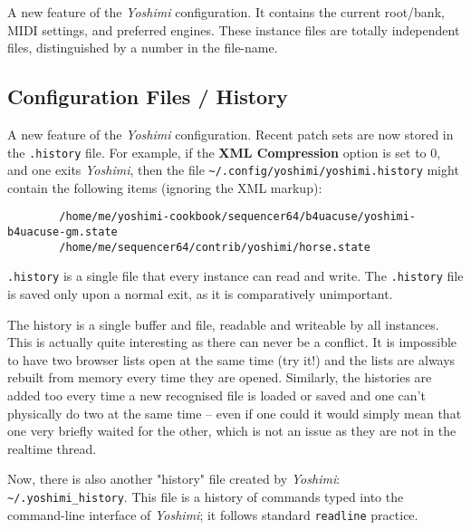    A new feature of the \textsl{Yoshimi} configuration.
   It contains the current root/bank, MIDI settings, and preferred engines.
   These instance files are totally independent files, distinguished by a number
   in the file-name.

\subsection{Configuration Files / History}
\label{subsec:configuration_history}

   A new feature of the \textsl{Yoshimi} configuration.
   Recent patch sets are now stored in the \texttt{.history} file.
   For example, if the \textbf{XML Compression} option is set to 0, and one
   exits \textsl{Yoshimi}, then the file
   \texttt{\textasciitilde/.config/yoshimi/yoshimi.history} might
   contain the following items (ignoring the XML markup):

   \begin{verbatim}
		/home/me/yoshimi-cookbook/sequencer64/b4uacuse/yoshimi-b4uacuse-gm.state
		/home/me/sequencer64/contrib/yoshimi/horse.state
   \end{verbatim}

   \texttt{.history} is a single file that every instance can read and write.
   The \texttt{.history} file is saved only upon a normal exit, as it is
   comparatively unimportant.

   The history is a single buffer and file, readable and writeable by all
   instances. This is actually quite interesting as there can never be a
   conflict.  It is impossible to have two browser lists open at the same time
   (try it!) and the lists are always rebuilt from memory every time they are
   opened. Similarly, the histories are added too every time a new recognised
   file is loaded or saved and one can't physically do two at the same time --
   even if one could it would simply mean that one very briefly waited for the
   other, which is not an issue as they are not in the realtime thread.

   Now, there is also another "history" file created by
   \textsl{Yoshimi}: \texttt{\textasciitilde/.yoshimi\_history}.
   This file is a history of commands typed into the command-line
   interface of \textsl{Yoshimi}; it follows standard
   \texttt{readline} practice.

